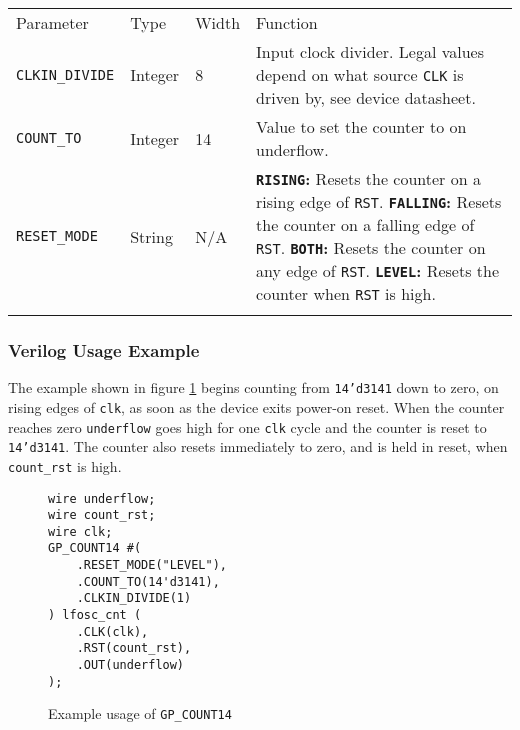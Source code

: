 \documentclass[11pt]{article}
\newcommand{\tokenstyle}[1]{\texttt{#1}}
\newcommand{\wirestyle}[1]{\texttt{#1}}
\newcommand{\valuestyle}[1]{\texttt{#1}}
\newcommand{\strvaluestyle}[1]{\valuestyle{\textquotedbl#1\textquotedbl}}
\newcommand{\strexamplestyle}[1]{\textbf{\strvaluestyle{#1}:}}
\newcommand{\datastyle}[1]{\texttt{#1}}
\newcommand{\whenstyle}[1]{{\fontseries{sb}\selectfont#1}}
\newcommand{\thinhline}{\Xhline{1\arrayrulewidth}}
\newcommand{\thickhline}{\Xhline{2.5\arrayrulewidth}}
\begin{document}
\begin{tabularx}{\textwidth}{lllX}
\thinhline
\whenstyle{Parameter} & \whenstyle{Type} & \whenstyle{Width} & \whenstyle{Function} \\
\thickhline
\tokenstyle{CLKIN\_DIVIDE} & Integer & 8 &
	Input clock divider. Legal values depend on what source \tokenstyle{CLK} is driven by, see device datasheet.\\
\thinhline
\tokenstyle{COUNT\_TO} & Integer & 14 & Value to set the counter to on underflow. \\
\thinhline
\tokenstyle{RESET\_MODE} & String & N/A &
	\strexamplestyle{RISING} Resets the counter on a rising edge of \tokenstyle{RST}. \newline
	\strexamplestyle{FALLING} Resets the counter on a falling edge of \tokenstyle{RST}. \newline
	\strexamplestyle{BOTH} Resets the counter on any edge of \tokenstyle{RST}. \newline
	\strexamplestyle{LEVEL} Resets the counter when \tokenstyle{RST} is high. \\
\thinhline
\end{tabularx}

\subsubsection{Verilog Usage Example}

The example shown in figure \ref{gp-count14-example} begins counting from \datastyle{14'd3141} down to zero, on
rising edges of \wirestyle{clk}, as soon as the device exits power-on reset. When the counter reaches zero
\wirestyle{underflow} goes high for one \wirestyle{clk} cycle and the counter is reset to \datastyle{14'd3141}.
The counter also resets immediately to zero, and is held in reset, when \wirestyle{count\_rst} is high.

\begin{figure}[h]
\begin{lstlisting}
wire underflow;
wire count_rst;
wire clk;
GP_COUNT14 #(
	.RESET_MODE("LEVEL"),
	.COUNT_TO(14'd3141),
	.CLKIN_DIVIDE(1)
) lfosc_cnt (
	.CLK(clk),
	.RST(count_rst),
	.OUT(underflow)
);
\end{lstlisting}
\caption{Example usage of \tokenstyle{GP\_COUNT14}}
\label{gp-count14-example}
\end{figure}

\end{document}
